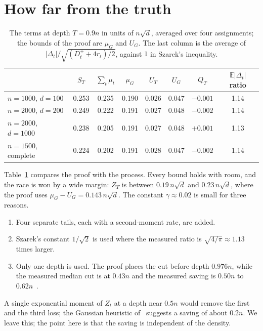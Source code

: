 \documentclass[11pt,a4paper]{article}
\theoremstyle{remark}
\newcommand{\E}{\mathbb{E}}
\begin{document}
\section{How far from the truth}\label{sec:truth}

\begin{table}[ht]
\centering
\begin{tabular}{lccccccc}
\toprule
 & $S_T$ & $\sum_t\mu_t$ & $\mu_G$ & $U_T$ & $U_G$ & $Q_T$ & $\E|\Delta_t|$ ratio\\
\midrule
$n=1000$, $d=100$ & 0.253 & 0.235 & 0.190 & 0.026 & 0.047 & $-0.001$ & 1.14\\
$n=2000$, $d=200$ & 0.249 & 0.222 & 0.191 & 0.027 & 0.048 & $-0.002$ & 1.14\\
$n=2000$, $d=1000$ & 0.238 & 0.205 & 0.191 & 0.027 & 0.048 & $+0.001$ & 1.13\\
$n=1500$, complete & 0.224 & 0.202 & 0.191 & 0.028 & 0.047 & $-0.002$ & 1.14\\
\bottomrule
\end{tabular}
\caption{The terms at depth $T=0.9n$ in units of $n\sqrt d$, averaged over
four assignments; the bounds of the proof are $\mu_G$ and $U_G$. The last
column is the average of $|\Delta_t|/\sqrt{(D^+_t+4r_t)/2}$, against $1$ in
Szarek's inequality.}\label{tab:terms}
\end{table}

Table~\ref{tab:terms} compares the proof with the process. Every bound holds
with room, and the race is won by a wide margin: $Z_T$ is between
$0.19\,n\sqrt d$ and $0.23\,n\sqrt d$, where the proof uses
$\mu_G-U_G=0.143\,n\sqrt d$. The constant
$\gamma\approx0.02$ is small for three reasons.
\begin{enumerate}
 \item Four separate tails, each with a second-moment rate, are added.
 \item Szarek's constant $1/\sqrt2$ is used where the measured ratio is
 $\sqrt{4/\pi}\approx1.13$ times larger.
 \item Only one depth is used. The proof places the cut before depth
 $0.976n$, while the measured median cut is at $0.43n$ and the measured saving
 is $0.50n$ to $0.62n$~\cite[Tables~1 and~2]{N7}.
\end{enumerate}
A single exponential moment of $Z_t$ at a depth near $0.5n$ would remove the
first and the third loss; the Gaussian heuristic of~\cite[Section~6]{N7}
suggests a saving of about $0.2n$. We leave this; the point here is that the
saving is independent of the density.
\end{document}
